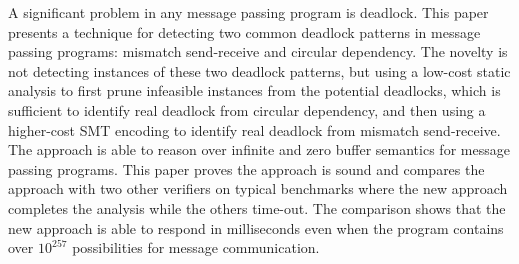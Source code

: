 A significant problem in any message passing program is deadlock. This paper presents a technique for detecting two common deadlock patterns in message passing programs: mismatch send-receive and circular dependency. The novelty is not detecting instances of these two deadlock patterns, but using a low-cost static analysis to first prune infeasible instances from the potential deadlocks, which is sufficient to identify real deadlock from circular dependency, and then using a higher-cost SMT encoding to identify real deadlock from mismatch send-receive. The approach is able to reason over infinite and zero buffer semantics for message passing programs. This paper proves the approach is sound and compares the approach with two other verifiers on typical benchmarks where the new approach completes the analysis while the others time-out. The comparison shows that the new approach is able to respond in milliseconds even when the program contains over $10^{257}$ possibilities for message communication.